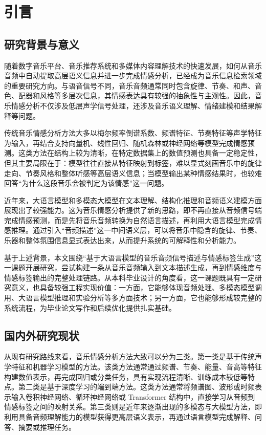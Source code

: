 ﻿%

\section{引言}

\subsection{研究背景与意义}
随着数字音乐平台、音乐推荐系统和多媒体内容理解技术的快速发展，如何从音乐音频中自动提取高层语义信息并进一步完成情感分析，已经成为音乐信息检索领域的重要研究方向\cite{yang2011musicemotion,panda2023audiofeatures}。与语音信号不同，音乐音频通常同时包含旋律、节奏、和声、音色、配器和风格等多层次信息，其情感表达具有较强的抽象性与主观性。因此，音乐情感分析不仅涉及低层声学信号处理，还涉及音乐语义理解、情绪建模和结果解释等问题\cite{yang2011musicemotion,panda2023audiofeatures}。

传统音乐情感分析方法大多以梅尔频率倒谱系数、频谱特征、节奏特征等声学特征为输入，再结合支持向量机、线性回归、随机森林或神经网络等模型完成情感预测\cite{yang2011musicemotion,panda2023audiofeatures}。这类方法在结构上较为清晰，在特定数据集上的数值预测也具备一定稳定性，但其主要局限在于：模型往往直接从特征映射到标签，难以显式刻画音乐中的旋律走向、节奏风格和整体听感等高层语义信息；当模型输出某种情感结果时，也较难回答“为什么这段音乐会被判定为该情感”这一问题。

近年来，大语言模型和多模态大模型在文本理解、结构化推理和音频语义建模方面展现出了较强能力\cite{tang2023salmonn,chu2024qwen2audio}。这为音乐情感分析提供了新的思路，即不再直接从音频信号端完成情感预测，而是先将音乐音频转换为自然语言描述，再利用大语言模型完成情感推理。通过引入“音频描述”这一中间语义层，可以将音乐中隐含的旋律、节奏、乐器和整体氛围信息显式表达出来，从而提升系统的可解释性和分析能力。

基于上述背景，本文围绕“基于大语言模型的音乐音频信号描述与情感标签生成”这一课题开展研究，尝试构建一条从音乐音频输入到文本描述生成，再到情感维度与情感标签输出的完整处理链路。从本科毕业设计的角度看，这一课题既具有一定研究意义，也具备较强工程实现价值：一方面，它能够体现音频处理、多模态模型调用、大语言模型推理和实验分析等多方面技术；另一方面，它也能够形成较完整的系统流程，为毕业论文写作和后续优化提供扎实基础。

\subsection{国内外研究现状}
从现有研究路线来看，音乐情感分析方法大致可以分为三类\cite{yang2011musicemotion,panda2023audiofeatures,tang2023salmonn}。第一类是基于传统声学特征和机器学习模型的方法。该类方法通常通过频谱、节奏、能量、音高等特征构建数值表示，再完成回归或分类任务，具有实现流程清晰、训练成本较低等特点。第二类是基于深度学习的端到端方法。这类方法通常将频谱图、波形或时频表示输入卷积神经网络、循环神经网络或 Transformer 结构中，直接学习从音频到情感标签之间的映射关系\cite{malik2017stacked,delbouys2018musicmood}。第三类则是近年来逐渐出现的多模态与大模型方法，即利用具备音频理解能力的模型获得更高层语义表示，再通过语言模型完成解释、问答、摘要或推理任务\cite{tang2023salmonn,chu2024qwen2audio}。

